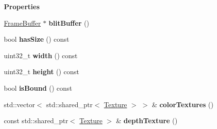 \begin{Indent}\textbf{ Properties}\par
\begin{DoxyCompactItemize}
\item 
\mbox{\label{classrev_1_1_frame_buffer_a5830ada5ac4025237b528685e44f5848}} 
\mbox{\hyperlink{classrev_1_1_frame_buffer}{Frame\+Buffer}} $\ast$ {\bfseries blit\+Buffer} ()
\item 
\mbox{\label{classrev_1_1_frame_buffer_ac693b942edc9dd93e918a9d4d0943f43}} 
bool {\bfseries has\+Size} () const
\item 
\mbox{\label{classrev_1_1_frame_buffer_aa343e13ce5f044957deb13539251d880}} 
uint32\+\_\+t {\bfseries width} () const
\item 
\mbox{\label{classrev_1_1_frame_buffer_a51c071059552fecc265b4c26837ad196}} 
uint32\+\_\+t {\bfseries height} () const
\item 
\mbox{\label{classrev_1_1_frame_buffer_a86a4da0164a1d9194bbf75fb89a087f9}} 
bool {\bfseries is\+Bound} () const
\item 
\mbox{\label{classrev_1_1_frame_buffer_a96977fc36deb21556c571bcfe22be382}} 
std\+::vector$<$ std\+::shared\+\_\+ptr$<$ \mbox{\hyperlink{classrev_1_1_texture}{Texture}} $>$ $>$ \& {\bfseries color\+Textures} ()
\item 
\mbox{\label{classrev_1_1_frame_buffer_a5e442f383d6349f166992dd6e77324f9}} 
const std\+::shared\+\_\+ptr$<$ \mbox{\hyperlink{classrev_1_1_texture}{Texture}} $>$ \& {\bfseries depth\+Texture} ()
\end{DoxyCompactItemize}
\end{Indent}
